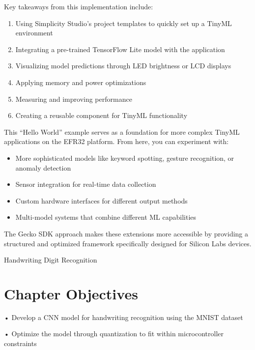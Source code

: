 \documentclass[
  9pt,
  letterpaper,
  abstract,
  titlepage]{scrbook}
\makeatletter
\providecommand{\tightlist}{%
  \setlength{\itemsep}{0pt}\setlength{\parskip}{0pt}}\usepackage{longtable,booktabs,array}
\def\tightlist{}
\let\tightlist\relax
\renewcommand\chapter{\clearpage\global\@topnum\z@
\@afterindentfalse \secdef\@chapter\@schapter}
\newif\if@firstnumbered%
\newif\if@firstunnumbered%
\newcounter{lastRomanPage}
\let\old@chapter\chapter%
\renewcommand{\chapter}{%
  \@ifstar{\unnumbered@chapter}{\numbered@chapter}%
}
\newcommand{\numbered@chapter}[1]{%
  \if@firstnumbered%
    \cleardoublepage%
    \setcounter{lastRomanPage}{\value{page}}%
    \pagenumbering{arabic}%
    \@firstnumberedfalse%
  \else
    \setcounter{page}{\value{page}}%
  \fi
  \old@chapter{#1}%
}
\newcommand{\unnumbered@chapter}[1]{%
  \if@firstunnumbered%
    \clearpage
    \setcounter{lastRomanPage}{\value{page}}%
    \pagenumbering{roman}%
    \@firstunnumberedfalse%
  \fi
  \old@chapter*{#1}%
}
\makeatother
\begin{document}
Key takeaways from this implementation include:

\begin{enumerate}
\def\labelenumi{\arabic{enumi}.}
\tightlist
\item
  Using Simplicity Studio's project templates to quickly set up a TinyML
  environment
\item
  Integrating a pre-trained TensorFlow Lite model with the application
\item
  Visualizing model predictions through LED brightness or LCD displays
\item
  Applying memory and power optimizations
\item
  Measuring and improving performance
\item
  Creating a reusable component for TinyML functionality
\end{enumerate}

This ``Hello World'' example serves as a foundation for more complex
TinyML applications on the EFR32 platform. From here, you can experiment
with:

\begin{itemize}
\tightlist
\item
  More sophisticated models like keyword spotting, gesture recognition,
  or anomaly detection
\item
  Sensor integration for real-time data collection
\item
  Custom hardware interfaces for different output methods
\item
  Multi-model systems that combine different ML capabilities
\end{itemize}

The Gecko SDK approach makes these extensions more accessible by
providing a structured and optimized framework specifically designed for
Silicon Labs devices.

\chapter{Handwriting Digit
Recognition}\label{handwriting-digit-recognition}

\section{Chapter Objectives}\label{chapter-objectives}

• Develop a CNN model for handwriting recognition using the MNIST
dataset

• Optimize the model through quantization to fit within microcontroller
constraints
\end{document}
